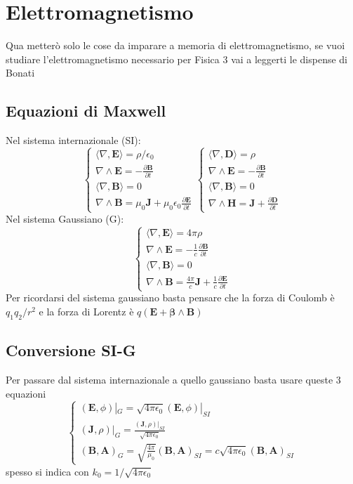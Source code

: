 \documentclass[11pt,a4paper]{report}
\newcommand{\vettore}[1]{\mathbf{#1}}
\newcommand{\pscal}[2]{\langle #1,#2\rangle}
\newcommand{\pvet}[2]{#1\wedge #2}
\begin{document}
\chapter{Elettromagnetismo}
	Qua metterò solo le cose da imparare a memoria di elettromagnetismo, se vuoi studiare l'elettromagnetismo necessario per Fisica 3 vai a leggerti le dispense di Bonati
	\section{Equazioni di Maxwell}
		Nel sistema internazionale (SI):
		\begin{equation}
			\begin{cases}
				\pscal \nabla{\vettore E}=\rho/\epsilon_0\\
				\pvet \nabla {\vettore E}=-\frac{\partial \vettore B}{\partial t}\\
				\pscal \nabla{\vettore B}=0\\
				\pvet \nabla {\vettore B}=\mu_0\vettore J+\mu_0\epsilon_0\frac{\partial \vettore E}{\partial t}
			\end{cases}
			\begin{cases}
				\pscal \nabla{\vettore D}=\rho\\
				\pvet \nabla {\vettore E}=-\frac{\partial \vettore B}{\partial t}\\
				\pscal \nabla{\vettore B}=0\\
				\pvet \nabla {\vettore H}=\vettore J+\frac{\partial \vettore D}{\partial t}
			\end{cases}
		\end{equation}
		Nel sistema Gaussiano (G):
		\begin{equation}
			\begin{cases}
				\pscal \nabla{\vettore E}=4\pi\rho\\
				\pvet \nabla {\vettore E}=-\frac 1 c \frac{\partial \vettore B}{\partial t}\\
				\pscal \nabla{\vettore B}=0\\
				\pvet \nabla {\vettore B}=\frac{4\pi}c \vettore J+\frac 1 c \frac{\partial \vettore E}{\partial t}
			\end{cases}
		\end{equation}
		Per ricordarsi del sistema gaussiano basta pensare che la forza di Coulomb è $q_1q_2/r^2$ e la forza di Lorentz è $q(\vettore E+\pvet{\vettore \beta}{\vettore B})$
	\section{Conversione SI-G}
		Per passare dal sistema internazionale a quello gaussiano basta usare queste 3 equazioni
		\begin{equation}
			\begin{cases}
				(\vettore E,\phi)|_G=\sqrt{4\pi\epsilon_0}(\vettore E,\phi)|_{SI}\\
				(\vettore J, \rho)|_G=\frac{(\vettore J, \rho)|_{SI}}{\sqrt{4\pi\epsilon_0}}\\
				(\vettore B,\vettore A)_G=
				\sqrt{\frac{4\pi}{\mu_0}}(\vettore B,\vettore A)_{SI}=
				c\sqrt{4\pi\epsilon_0}(\vettore B,\vettore A)_{SI}
			\end{cases}
		\end{equation}
		spesso si indica con $k_0=1/\sqrt{4\pi\epsilon_0}$
\end{document}
